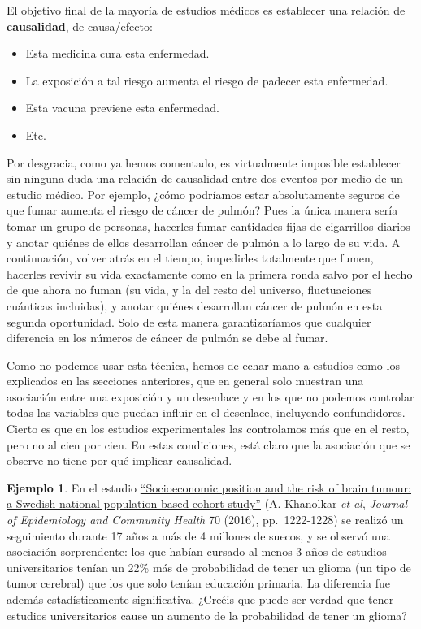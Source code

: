 \documentclass[
]{book}
\providecommand{\tightlist}{%
  \setlength{\itemsep}{0pt}\setlength{\parskip}{0pt}}
\theoremstyle{definition}
\theoremstyle{definition}
\newtheorem{example}{Ejemplo}[chapter]
\theoremstyle{definition}
\theoremstyle{definition}
\theoremstyle{remark}
\begin{document}
El objetivo final de la mayoría de estudios médicos es establecer una relación de \textbf{causalidad}, de causa/efecto:

\begin{itemize}
\tightlist
\item
  Esta medicina cura esta enfermedad.
\item
  La exposición a tal riesgo aumenta el riesgo de padecer esta enfermedad.
\item
  Esta vacuna previene esta enfermedad.
\item
  Etc.
\end{itemize}

Por desgracia, como ya hemos comentado, es virtualmente imposible establecer sin ninguna duda una relación de causalidad entre dos eventos por medio de un estudio médico. Por ejemplo, ¿cómo podríamos estar absolutamente seguros de que fumar aumenta el riesgo de cáncer de pulmón? Pues la única manera sería tomar un grupo de personas, hacerles fumar cantidades fijas de cigarrillos diarios y anotar quiénes de ellos desarrollan cáncer de pulmón a lo largo de su vida. A continuación, volver atrás en el tiempo, impedirles totalmente que fumen, hacerles revivir su vida exactamente como en la primera ronda salvo por el hecho de que ahora no fuman (su vida, y la del resto del universo, fluctuaciones cuánticas incluidas), y anotar quiénes desarrollan cáncer de pulmón en esta segunda oportunidad. Solo de esta manera garantizaríamos que cualquier diferencia en los números de cáncer de pulmón se debe al fumar.

Como no podemos usar esta técnica, hemos de echar mano a estudios como los explicados en las secciones anteriores, que en general solo muestran una asociación entre una exposición y un desenlace y en los que no podemos controlar todas las variables que puedan influir en el desenlace, incluyendo confundidores. Cierto es que en los estudios experimentales las controlamos más que en el resto, pero no al cien por cien. En estas condiciones, está claro que la asociación que se observe no tiene por qué implicar causalidad.

\begin{example}
\protect\hypertarget{exm:univturmor}{}\label{exm:univturmor}En el estudio \href{https://jech.bmj.com/content/70/12/1222}{``Socioeconomic position and the risk of brain tumour: a Swedish national population-based cohort study''} (A. Khanolkar \emph{et al}, \emph{Journal of Epidemiology and Community Health} 70 (2016), pp.~1222-1228) se realizó un seguimiento durante 17 años a más de 4 millones de suecos, y se observó una asociación sorprendente: los que habían cursado al menos 3 años de estudios universitarios tenían un 22\% más de probabilidad de tener un glioma (un tipo de tumor cerebral) que los que solo tenían educación primaria. La diferencia fue además estadísticamente significativa. ¿Creéis que puede ser verdad que tener estudios universitarios cause un aumento de la probabilidad de tener un glioma?
\end{example}
\end{document}
